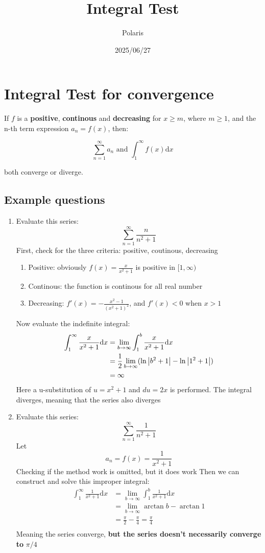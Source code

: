 \documentclass{article}
\title{Integral Test}
\author{Polaris}
\date{2025/06/27}
\numberwithin{equation}{section}
\begin{document}
\section{Integral Test for convergence}
If $f$ is a \textbf{positive}, \textbf{continous} and \textbf{decreasing} for $x \geq m$, where $m \geq 1$, and the n-th term expression $a_n = f(x)$, then:

\begin{equation}
    \sum_{n = 1}^{\infty} a_n \text{ and } \int_{1}^{\infty} f(x) \mathrm{d}x
\end{equation}

both converge or diverge.

\subsection{Example questions}
\begin{enumerate}
    \item Evaluate this series:
    \[
        \sum_{n = 1}^{\infty} \frac{n}{n^2 + 1} 
    \]
    First, check for the three criteria: positive, coutinous, decreasing
    \begin{enumerate}
        \item Positive: obviously $f(x) = \frac{x}{x^2 + 1}$ is positive in $[1 , \infty)$
        \item Continous: the function is continous for all real number
        \item Decreasing: $f'(x) = -\frac{x^2 - 1}{(x^2 + 1)^2}$, and $f'(x) < 0$ when $x > 1$
    \end{enumerate}
    Now evaluate the indefinite integral:
    \[
        \begin{split}
            \int_{1}^{\infty} \frac{x}{x^2 + 1} \mathrm{d}x &= \lim_{b\to \infty} \int_{1}^{b} \frac{x}{x^2 + 1} \mathrm{d}x\\
            & = \frac{1}{2} \lim_{b\to \infty} (\ln \abs{b^2 + 1} - \ln \abs{1^2 + 1})\\
            & = \infty
        \end{split}
    \]
    Here a u-substitution of $u = x^2+1$ and $du = 2x$ is performed. 
    The integral diverges, meaning that the series also diverges

    \item Evaluate this series:
    \[
        \sum_{n = 1}^{\infty} \frac{1}{n^2 + 1}
    \]
    Let 
    \[
        a_n = f(x) = \frac{1}{x^2 + 1}
    \]
    Checking if the method work is omitted, but it does work
    Then we can construct and solve this improper integral:
    \[
        \begin{split}
            \int_{1}^{\infty} \frac{1}{x^2 + 1} \mathrm{d}x & = \lim_{b\to \infty} \int_{1}^{b} \frac{1}{x^2 + 1}\mathrm{d}x\\
            & = \lim_{b\to \infty} \arctan b - \arctan 1\\
            & = \frac{\pi}{2} - \frac{\pi}{4} = \frac{\pi}{4}\\
        \end{split}
    \]
    Meaning the series converge, \textbf{but the series doesn't necessarily converge to} $\pi/4$
\end{enumerate}
\end{document}
